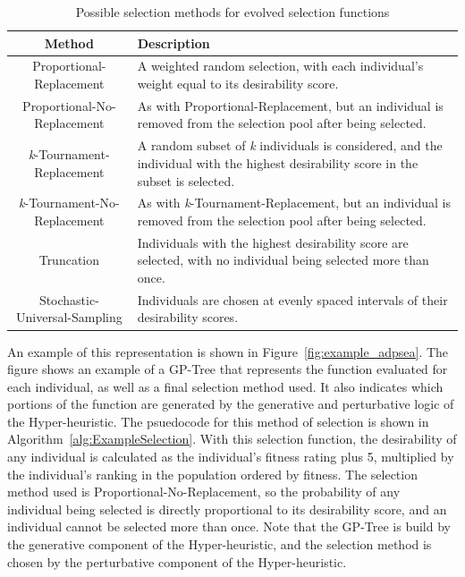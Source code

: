 \documentclass[times,12pt,titlepage]{mstogs}
\begin{document}
\begin{ThesisBody}
\begin{table}
\centering
  \caption{Possible selection methods for evolved selection functions}
  \label{tab:selection_methods}
  \begin{tabular}{c|p{9cm}}
    \hline
    Method & Description\\
    \hline
    Proportional-Replacement & A weighted random selection, with each individual's weight equal to its desirability score. \\
    \hline
    Proportional-No-Replacement & As with Proportional-Replacement, but an individual is removed from the selection pool after being selected.\\
    \hline
    \textit{k}-Tournament-Replacement& A random subset of \textit{k} individuals is considered, and the individual with the highest desirability score in the subset is selected. \\
    \hline
    \textit{k}-Tournament-No-Replacement & As with \textit{k}-Tournament-Replacement, but an individual is removed from the selection pool after being selected.\\
    \hline
	Truncation & Individuals with the highest desirability score are selected, with no individual being selected more than once. \\
	\hline
	Stochastic-Universal-Sampling & Individuals are chosen at evenly spaced intervals of their desirability scores. \\
	
  \hline
\end{tabular}
\end{table}

An example of this representation is shown in Figure~\ref{fig:example_adpsea}. The figure shows an example of a GP-Tree that represents the function evaluated for each individual, as well as a final selection method used. It also indicates which portions of the function are generated by the generative and perturbative logic of the Hyper-heuristic. The psuedocode for this method of selection is shown in Algorithm~\ref{alg:ExampleSelection}. With this selection function, the desirability of any individual is calculated as the individual's fitness rating plus 5, multiplied by the individual's ranking in the population ordered by fitness. The selection method used is Proportional-No-Replacement, so the probability of any individual being selected is directly proportional to its desirability score, and an individual cannot be selected more than once. Note that the GP-Tree is build by the generative component of the Hyper-heuristic, and the selection method is chosen by the perturbative component of the Hyper-heuristic.


\end{ThesisBody}
\end{document}
